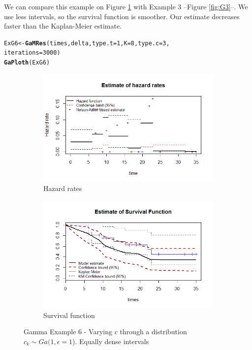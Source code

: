 \documentclass[letterpaper]{article}\usepackage[]{graphicx}\usepackage[]{color}
\makeatletter
\newcommand{\hlnum}[1]{\textcolor[rgb]{0.686,0.059,0.569}{#1}}%
\newcommand{\hlstd}[1]{\textcolor[rgb]{0.345,0.345,0.345}{#1}}%
\newcommand{\hlkwb}[1]{\textcolor[rgb]{0.69,0.353,0.396}{#1}}%
\newcommand{\hlkwc}[1]{\textcolor[rgb]{0.333,0.667,0.333}{#1}}%
\newcommand{\hlkwd}[1]{\textcolor[rgb]{0.737,0.353,0.396}{\textbf{#1}}}%
\newenvironment{kframe}{%
 \def\at@end@of@kframe{}%
 \ifinner\ifhmode%
  \def\at@end@of@kframe{\end{minipage}}%
  \begin{minipage}{\columnwidth}%
 \fi\fi%
 \def\FrameCommand##1{\hskip\@totalleftmargin \hskip-\fboxsep
 \colorbox{shadecolor}{##1}\hskip-\fboxsep
     \hskip-\linewidth \hskip-\@totalleftmargin \hskip\columnwidth}%
 \MakeFramed {\advance\hsize-\width
   \@totalleftmargin\z@ \linewidth\hsize
   \@setminipage}}%
 {\par\unskip\endMakeFramed%
 \at@end@of@kframe}
\newenvironment{knitrout}{}{} %
\makeatother
\begin{document}
We can compare this example on Figure \ref{fig:G6} with Example 3 --Figure \ref{fig:G3}--. We use less intervals, so the survival function is smoother. Our estimate decreases faster than the Kaplan-Meier estimate. 

\begin{knitrout}
\color{fgcolor}\begin{kframe}
\begin{alltt}
\hlstd{ExG6} \hlkwb{<-} \hlkwd{GaMRes}\hlstd{(times, delta,} \hlkwc{type.t} \hlstd{=} \hlnum{1}\hlstd{,} \hlkwc{K} \hlstd{=} \hlnum{8}\hlstd{,} \hlkwc{type.c} \hlstd{=} \hlnum{3}\hlstd{,}
               \hlkwc{iterations}\hlstd{=}\hlnum{3000}\hlstd{)}
\hlkwd{GaPloth}\hlstd{(ExG6)}
\end{alltt}
\end{kframe}
\end{knitrout}

\begin{figure}
  \centering
  \begin{subfigure}[a]{\textwidth}\centering
    \includegraphics[width=\textwidth]{G61.png}
    \caption{Hazard rates}
  \end{subfigure}
  \begin{subfigure}[b]{\textwidth}\centering
    \includegraphics[width=\textwidth]{G62.png}
    \caption{Survival function}
  \end{subfigure}
  \caption{Gamma Example 6 - Varying $c$ through a distribution $c_k\sim Ga(1,\epsilon = 1$). Equally dense intervals}
  \label{fig:G6}
\end{figure}
\end{document}
